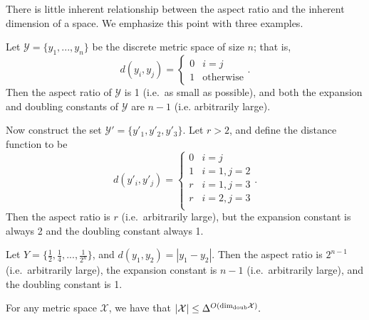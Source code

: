 \documentclass[../main.tex]{subfiles}
\newcommand{\set}[1]{\mathcal {#1}}
\newcommand{\dist}[2]{\distf({#1},{#2})}
\newcommand{\distf}{d}
\newcommand{\aspect}[1]{\Delta}
\newcommand{\doubdim}{\text{dim}_\textnormal{doub}}
\begin{document}
There is little inherent relationship between the aspect ratio and the inherent dimension of a space.
We emphasize this point with three examples.

\begin{example}
    Let $\set Y=\{y_1,...,y_n\}$ be the discrete metric space of size $n$;
    that is,
    \begin{equation}
        \dist{y_i}{y_j}=
        \begin{cases}
            0 & i = j \\
            1 & \text{otherwise}
        \end{cases}
        .
    \end{equation}
    Then the aspect ratio of $\set Y$ is 1 (i.e.\ as small as possible),
    and both the expansion and doubling constants of $\set Y$ are $n-1$ (i.e. arbitrarily large).
\end{example}

\begin{example}
    Now construct the set $\set Y'=\{y'_1, y'_2, y'_3\}$.
    Let $r>2$, and define the distance function to be
    \begin{equation}
        d(y'_i,y'_j) =
        \begin{cases}
            0 & i=j \\
            1 & i=1, j=2 \\
            r & i=1, j=3 \\
            r & i=2, j=3 \\
        \end{cases}
        .
    \end{equation}
    Then the aspect ratio is $r$ (i.e.\ arbitrarily large),
    but the expansion constant is always 2
    and the doubling constant always 1.
\end{example}

\begin{example}
    Let $Y=\{\frac 1 2, \frac 1 4, ..., \frac 1 {2^n}\}$,
    and $\dist{y_1}{y_2}=|y_1-y_2|$.
    Then the aspect ratio is $2^{n-1}$ (i.e.\ arbitrarily large),
    the expansion constant is $n-1$ (i.e.\ arbitrarily large),
    and the doubling constant is 1.
\end{example}

\begin{lemma}
    For any metric space $\set X$, we have that
    $
        |\set X| \le \aspect{\set X}^{O(\doubdim{\set X})}.
    $
\end{lemma}
\end{document}

